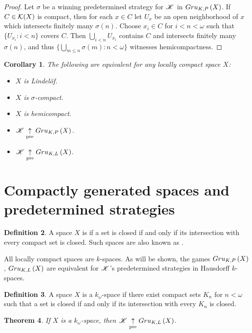 \documentclass{amsart}
\newtheorem{theorem}{Theorem}[section]
\newtheorem{corollary}[theorem]{Corollary}
\theoremstyle{definition}
\newtheorem{definition}[theorem]{Definition}
\begin{document}
\begin{proof}
  Let \(\sigma\) be a winning predetermined strategy for \(\mathscr{K}\) in
  \(Gru_{K,P}\left({X}\right)\). If \(C\in \mathcal{K}(X)\) is compact, then for each \(x\in C\) let
  \(U_x\) be an open neighborhood of \(x\) which intersects finitely many
  \(\sigma(n)\). Choose \(x_i\in C\) for \(i<n<\omega\) such that
  \(\{U_{x_i}:i<n\}\) covers \(C\). Then \(\bigcup_{i<n}U_{x_i}\) contains \(C\)
  and intersects finitely many \(\sigma(n)\), and thus
  \(\{\bigcup_{m\leq n}\sigma(m):n<\omega\}\) witnesses hemicompactness.
\end{proof}

\begin{corollary}
  The following are equivalent for any locally compact space \(X\):
    \begin{itemize}
      \item \(X\) is Lindel\"of.
      \item \(X\) is \(\sigma\)-compact.
      \item \(X\) is hemicompact.
      \item \(\mathscr{K} \underset{\text{pre}}{\uparrow} Gru_{K,P}\left({X}\right)\).
      \item \(\mathscr{K} \underset{\text{pre}}{\uparrow} Gru_{K,L}\left({X}\right)\).
    \end{itemize}
\end{corollary}

\section{Compactly generated spaces and predetermined strategies}

\begin{definition}
  A space \(X\) is  if a set is closed if and
  only if its intersection with every compact set is closed. Such
  spaces are also known as .
\end{definition}

All locally compact spaces are \(k\)-spaces. As will be shown,
the games \(Gru_{K,P}\left({X}\right)\), \(Gru_{K,L}\left({X}\right)\) are equivalent for \(\mathscr{K}\)'s
predetermined strategies in Hausdorff \(k\)-spaces.

\begin{definition}
  A space \(X\) is a \(k_\omega\)-space if there exist compact sets \(K_n\) for
  \(n<\omega\) such that a set is closed if and
  only if its intersection with every \(K_n\) is closed.
\end{definition}

\begin{theorem}
  If \(X\) is a \(k_\omega\)-space, then
  \(\mathscr{K} \underset{\text{pre}}{\uparrow} Gru_{K,L}\left({X}\right)\).
\end{theorem}
\end{document}
